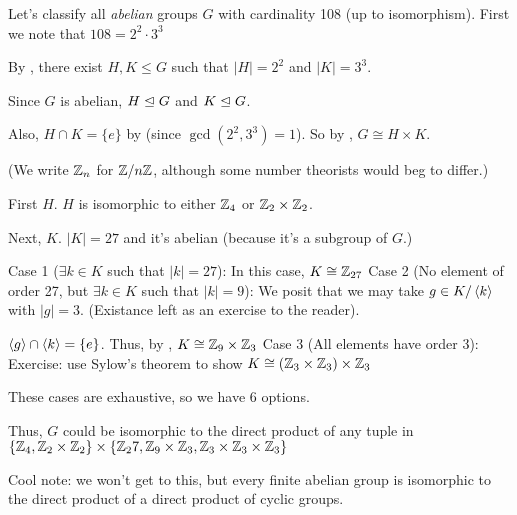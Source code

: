 \documentclass[notes.tex]{subfiles}
\begin{document}
\begin{eg}
	Let's classify all \emph{abelian} groups $G$ with cardinality 108 (up to isomorphism). First we note that $108 =2^2\cdot 3^3$

	By , there exist $H, K\le G$ such that $|H| = 2^2$ and $|K| = 3^3$.

	Since $G$ is abelian, $H\trianglelefteq G$ and $K\trianglelefteq G$.

	Also, $H\cap K = \{e\}$ by  (since $\gcd(2^2, 3^3)=1$). So by , $G\cong H\times K$. 

	(We write $\mathbb{Z}_n$ for $\mathbb{Z}/n\mathbb{Z}$, although some number theorists would beg to differ.)

	First $H$. $H$ is isomorphic to either $\mathbb{Z}_4$ or $\mathbb{Z}_2\times\mathbb{Z}_2$.

	Next, $K$. $|K| = 27$ and it's abelian (because it's a subgroup of $G$.)

	Case 1 ($\exists k\in K$ such that $|k| = 27$):
	\tabin
		In this case, $K\cong\mathbb{Z}_{27}$
	\tabout
	Case 2 (No element of order 27, but $\exists k\in K$ such that $|k| = 9$):
	\tabin
		We posit that we may take $g\in K/\left\langle{k}\right\rangle$ with $|g| = 3$. (Existance left as an exercise to the reader).

		$\left\langle{g}\right\rangle\cap \left\langle{k}\right\rangle = \{e\}$.
		Thus, by , $K\cong \mathbb{Z}_9\times \mathbb{Z}_3$
	\tabout
	Case 3 (All elements have order 3):
	\tabin
		Exercise: use Sylow's theorem to show $K\cong (\mathbb{Z}_3\times\mathbb{Z}_3)\times\mathbb{Z}_3$
	\tabout

	These cases are exhaustive, so we have 6 options.

	Thus, $G$ could be isomorphic to the direct product of any tuple in 
	$\{\mathbb{Z}_4, \mathbb{Z}_2\times\mathbb{Z}_2\} \times \{\mathbb{Z}_27, \mathbb{Z}_9\times \mathbb{Z}_3, \mathbb{Z}_3\times\mathbb{Z}_3\times\mathbb{Z}_3\}$
\end{eg}

Cool note: we won't get to this, but every finite abelian group is isomorphic to the direct product of a direct product of cyclic groups.
\end{document}
